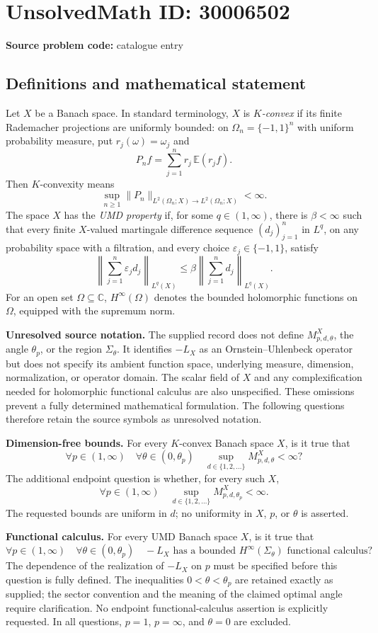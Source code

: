 \documentclass[11pt]{article}
\newcommand{\C}{\mathbb{C}}
\newcommand{\E}{\mathbb{E}}
\begin{document}
\section*{UnsolvedMath ID: 30006502}
\textbf{Source problem code:} catalogue entry
\subsection{Definitions and mathematical statement}
Let \(X\) be a Banach space. In standard terminology, \(X\) is \emph{\(K\)-convex} if its finite Rademacher projections are uniformly bounded: on \(\Omega_n=\{-1,1\}^n\) with uniform probability measure, put \(r_j(\omega)=\omega_j\) and
\[
P_n f=\sum_{j=1}^n r_j\,\E(r_j f).
\]
Then \(K\)-convexity means
\[
\sup_{n\geq1}\|P_n\|_{L^2(\Omega_n;X)\to L^2(\Omega_n;X)}<\infty.
\]
The space \(X\) has the \emph{UMD property} if, for some \(q\in(1,\infty)\), there is \(\beta<\infty\) such that every finite \(X\)-valued martingale difference sequence \((d_j)_{j=1}^n\) in \(L^q\), on any probability space with a filtration, and every choice \(\varepsilon_j\in\{-1,1\}\), satisfy
\[
\left\|\sum_{j=1}^n\varepsilon_j d_j\right\|_{L^q(X)}
\leq \beta\left\|\sum_{j=1}^n d_j\right\|_{L^q(X)}.
\]
For an open set \(\Omega\subseteq\C\), \(H^\infty(\Omega)\) denotes the bounded holomorphic functions on \(\Omega\), equipped with the supremum norm.

\textbf{Unresolved source notation.} The supplied record does not define \(M_{p,d,\theta}^X\), the angle \(\theta_p\), or the region \(\Sigma_\theta\). It identifies \(-L_X\) as an Ornstein--Uhlenbeck operator but does not specify its ambient function space, underlying measure, dimension, normalization, or operator domain. The scalar field of \(X\) and any complexification needed for holomorphic functional calculus are also unspecified. These omissions prevent a fully determined mathematical formulation. The following questions therefore retain the source symbols as unresolved notation.

\textbf{Dimension-free bounds.} For every \(K\)-convex Banach space \(X\), is it true that
\[
\forall p\in(1,\infty)\quad
\forall\theta\in(0,\theta_p)\quad
\sup_{d\in\{1,2,\ldots\}}M_{p,d,\theta}^X<\infty?
\]
The additional endpoint question is whether, for every such \(X\),
\[
\forall p\in(1,\infty)\quad
\sup_{d\in\{1,2,\ldots\}}M_{p,d,\theta_p}^X<\infty.
\]
The requested bounds are uniform in \(d\); no uniformity in \(X\), \(p\), or \(\theta\) is asserted.

\textbf{Functional calculus.} For every UMD Banach space \(X\), is it true that
\[
\forall p\in(1,\infty)\quad
\forall\theta\in(0,\theta_p)\quad
-L_X\text{ has a bounded }H^\infty(\Sigma_\theta)\text{ functional calculus}?
\]
The dependence of the realization of \(-L_X\) on \(p\) must be specified before this question is fully defined. The inequalities \(0<\theta<\theta_p\) are retained exactly as supplied; the sector convention and the meaning of the claimed optimal angle require clarification. No endpoint functional-calculus assertion is explicitly requested. In all questions, \(p=1\), \(p=\infty\), and \(\theta=0\) are excluded.
\end{document}

